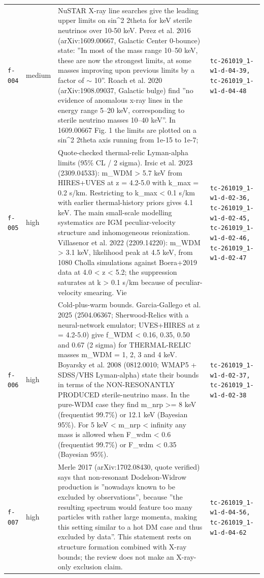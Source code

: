\documentclass[11pt,a4paper]{article}
\begin{document}
\begin{longtable}{@{}p{}p{}p{}p{}@{}}
\texttt{f-004} & medium & NuSTAR X-ray line searches give the leading upper limits on sin\textasciicircum{}2 2theta for keV sterile neutrinos over 10-50 keV. Perez et al. 2016 (arXiv:1609.00667, Galactic Center 0-bounce) state: ''In most of the mass range 10--50 keV, these are now the strongest limits, at some masses improving upon previous limits by a factor of $\sim$ 10''. Roach et al. 2020 (arXiv:1908.09037, Galactic bulge) find ''no evidence of anomalous x-ray lines in the energy range 5--20 keV, corresponding to sterile neutrino masses 10--40 keV''. In 1609.00667 Fig. 1 the limits are plotted on a sin\textasciicircum{}2 2theta axis running from 1e-15 to 1e-7; & \texttt{tc-261019\_\allowbreak{}1-w1-d-04-39,\allowbreak{} tc-261019\_\allowbreak{}1-w1-d-04-48} \\
\texttt{f-005} & high & Quote-checked thermal-relic Lyman-alpha limits (95\% CL / 2 sigma). Irsic et al. 2023 (2309.04533): m\_WDM \textgreater{} 5.7 keV from HIRES+UVES at z = 4.2-5.0 with k\_max = 0.2 s/km. Restricting to k\_max \textless{} 0.1 s/km with earlier thermal-history priors gives 4.1 keV. The main small-scale modelling systematics are IGM peculiar-velocity structure and inhomogeneous reionization. Villasenor et al. 2022 (2209.14220): m\_WDM \textgreater{} 3.1 keV, likelihood peak at 4.5 keV, from 1080 Cholla simulations against Boera+2019 data at 4.0 \textless{} z \textless{} 5.2; the suppression saturates at k \textgreater{} 0.1 s/km because of peculiar-velocity smearing. Vie & \texttt{tc-261019\_\allowbreak{}1-w1-d-02-36,\allowbreak{} tc-261019\_\allowbreak{}1-w1-d-02-45,\allowbreak{} tc-261019\_\allowbreak{}1-w1-d-02-46,\allowbreak{} tc-261019\_\allowbreak{}1-w1-d-02-47} \\
\texttt{f-006} & high & Cold-plus-warm bounds. Garcia-Gallego et al. 2025 (2504.06367; Sherwood-Relics with a neural-network emulator; UVES+HIRES at z = 4.2-5.0) give f\_WDM \textless{} 0.16, 0.35, 0.50 and 0.67 (2 sigma) for THERMAL-RELIC masses m\_WDM = 1, 2, 3 and 4 keV. Boyarsky et al. 2008 (0812.0010; WMAP5 + SDSS/VHS Lyman-alpha) state their bounds in terms of the NON-RESONANTLY PRODUCED sterile-neutrino mass. In the pure-WDM case they find m\_nrp \textgreater{}= 8 keV (frequentist 99.7\%) or 12.1 keV (Bayesian 95\%). For 5 keV \textless{} m\_nrp \textless{} infinity any mass is allowed when F\_wdm \textless{} 0.6 (frequentist 99.7\%) or F\_wdm \textless{} 0.35 (Bayesian 95\%). & \texttt{tc-261019\_\allowbreak{}1-w1-d-02-37,\allowbreak{} tc-261019\_\allowbreak{}1-w1-d-02-38} \\
\texttt{f-007} & high & Merle 2017 (arXiv:1702.08430, quote verified) says that non-resonant Dodelson-Widrow production is ''nowadays known to be excluded by observations'', because ''the resulting spectrum would feature too many particles with rather large momenta, making this setting similar to a hot DM case and thus excluded by data''. This statement rests on structure formation combined with X-ray bounds; the review does not make an X-ray-only exclusion claim. & \texttt{tc-261019\_\allowbreak{}1-w1-d-04-56,\allowbreak{} tc-261019\_\allowbreak{}1-w1-d-04-62} \\

\end{longtable}
\end{document}

